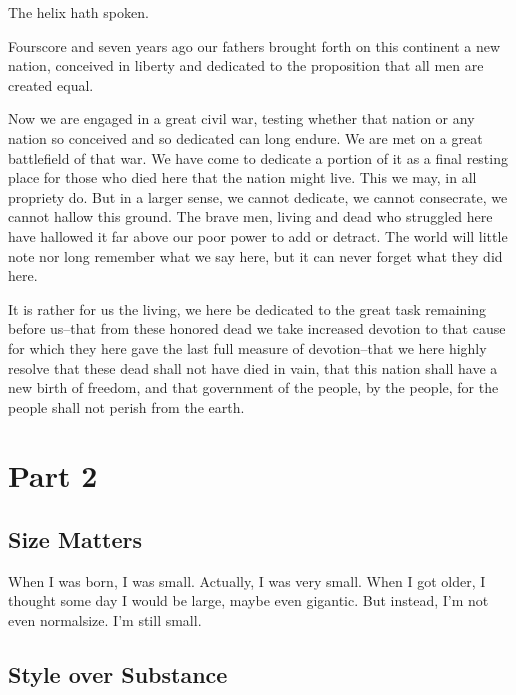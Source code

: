 \documentclass{article}
\begin{document}
The helix hath spoken.

\begin{center}
Fourscore and seven years ago our fathers brought forth on this
continent a new nation, conceived in liberty and dedicated to the
proposition that all men are created equal.
\end{center}

\begin{flushleft}
Now we are engaged in a great civil war, testing whether that nation
or any nation so conceived and so dedicated can long endure. We are
met on a great battlefield of that war. We have come to dedicate a
portion of it as a final resting place for those who died here that
the nation might live. This we may, in all propriety do. But in a
larger sense, we cannot dedicate, we cannot consecrate, we cannot
hallow this ground. The brave men, living and dead who struggled here
have hallowed it far above our poor power to add or detract. The
world will little note nor long remember what we say here, but it can
never forget what they did here.
\end{flushleft}

\begin{flushright}
It is rather for us the living, we here be dedicated to the great
task remaining before us--that from these honored dead we take
increased devotion to that cause for which they here gave the last
full measure of devotion--that we here highly resolve that these dead
shall not have died in vain, that this nation shall have a new birth
of freedom, and that government of the people, by the people, for the
people shall not perish from the earth.
\end{flushright}

\section{Part 2}

\subsection{Size Matters}

When I was born, I was {\small small}. Actually, {\scriptsize I was
very small}. When I got older, I thought some day {\Large I would be
large}, {\Huge maybe even gigantic}. But instead, I'm not even
normalsize. {\small I'm still small.}


\subsection {Style over Substance}
\end{document}
